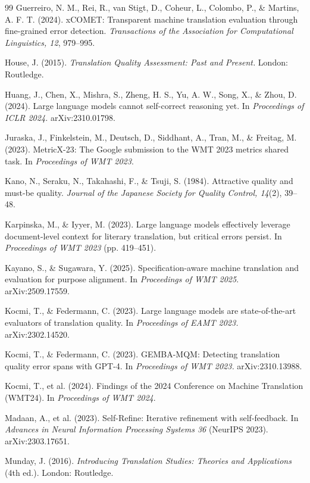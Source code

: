 \documentclass[11pt]{article}
\begin{document}
\begin{thebibliography}{99}
 Guerreiro, N. M., Rei, R., van Stigt, D., Coheur, L., Colombo, P., \& Martins, A. F. T. (2024). xCOMET: Transparent machine translation evaluation through fine-grained error detection. \emph{Transactions of the Association for Computational Linguistics, 12}, 979--995.

 House, J. (2015). \emph{Translation Quality Assessment: Past and Present.} London: Routledge.

 Huang, J., Chen, X., Mishra, S., Zheng, H. S., Yu, A. W., Song, X., \& Zhou, D. (2024). Large language models cannot self-correct reasoning yet. In \emph{Proceedings of ICLR 2024.} arXiv:2310.01798.

 Juraska, J., Finkelstein, M., Deutsch, D., Siddhant, A., Tran, M., \& Freitag, M. (2023). MetricX-23: The Google submission to the WMT 2023 metrics shared task. In \emph{Proceedings of WMT 2023}.

 Kano, N., Seraku, N., Takahashi, F., \& Tsuji, S. (1984). Attractive quality and must-be quality. \emph{Journal of the Japanese Society for Quality Control, 14}(2), 39--48.

 Karpinska, M., \& Iyyer, M. (2023). Large language models effectively leverage document-level context for literary translation, but critical errors persist. In \emph{Proceedings of WMT 2023} (pp. 419--451).

 Kayano, S., \& Sugawara, Y. (2025). Specification-aware machine translation and evaluation for purpose alignment. In \emph{Proceedings of WMT 2025}. arXiv:2509.17559.

 Kocmi, T., \& Federmann, C. (2023). Large language models are state-of-the-art evaluators of translation quality. In \emph{Proceedings of EAMT 2023.} arXiv:2302.14520.

 Kocmi, T., \& Federmann, C. (2023). GEMBA-MQM: Detecting translation quality error spans with GPT-4. In \emph{Proceedings of WMT 2023.} arXiv:2310.13988.

 Kocmi, T., et al. (2024). Findings of the 2024 Conference on Machine Translation (WMT24). In \emph{Proceedings of WMT 2024}.

 Madaan, A., et al. (2023). Self-Refine: Iterative refinement with self-feedback. In \emph{Advances in Neural Information Processing Systems 36} (NeurIPS 2023). arXiv:2303.17651.

 Munday, J. (2016). \emph{Introducing Translation Studies: Theories and Applications} (4th ed.). London: Routledge.


\end{thebibliography}
\end{document}
